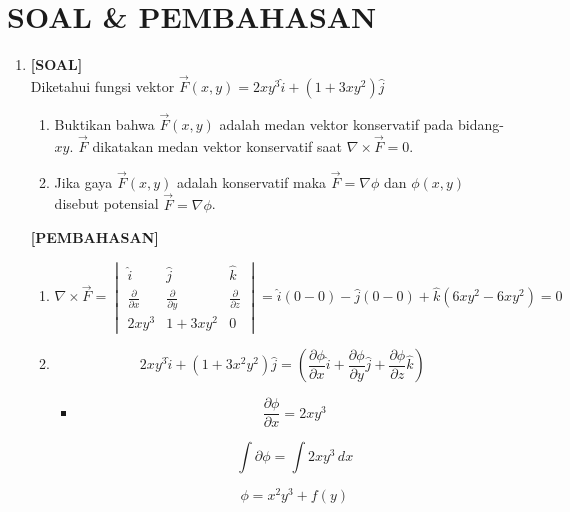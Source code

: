 \documentclass[a4paper,12pt]{article}
\begin{document}
\newpage

\section*{SOAL \& PEMBAHASAN  }
\begin{enumerate}
    \item \textbf{[SOAL]}\\
          Diketahui fungsi vektor \( \vec{F}(x,y) = 2xy^3 \hat{i} + (1 + 3xy^2) \hat{j} \)
        \begin{enumerate}[start = 1]
         \item  Buktikan bahwa \( \vec{F}(x,y) \) adalah medan vektor konservatif pada bidang-$xy$.
         \( \vec{F} \) dikatakan medan vektor konservatif saat \( \nabla \times \vec{F} = 0 \).
         
         \item Jika gaya \( \vec{F}(x,y) \) adalah konservatif maka \( \vec{F} = \nabla \phi \) dan \( \phi (x,y) \) disebut potensial \( \vec{F} = \nabla \phi \).
         
\end{enumerate}

        \textbf{[PEMBAHASAN]}
        \begin{enumerate}[start = 1]
        \item \[
            \nabla \times \vec{F} = \begin{vmatrix}
            \hat{i} & \hat{j} & \hat{k} \\
            \frac{\partial}{\partial x} & \frac{\partial}{\partial y} & \frac{\partial}{\partial z} \\
            2xy^3 & 1 + 3xy^2 & 0
            \end{vmatrix}
            = \hat{i} (0 - 0) - \hat{j} (0 - 0) + \hat{k} (6xy^2 - 6xy^2) = 0
            \]
        \item \[
2xy^3 \hat{i} + (1 + 3x^2y^2) \hat{j} = \left(\frac{\partial \phi}{\partial x} \hat{i} + \frac{\partial \phi}{\partial y} \hat{j} + \frac{\partial \phi}{\partial z} \hat{k} \right)
\]

\vspace{0.2cm}

\begin{itemize}
    \item
    \[
    \frac{\partial \phi}{\partial x} = 2xy^3
    \]
        
    \[
    \int {\partial \phi}  = \int 2xy^3 \, dx
    \]
        
    \[
    \phi = x^2y^3 + f(y)
    \]
\end{itemize}


\end{enumerate}
\end{enumerate}
\end{document}
